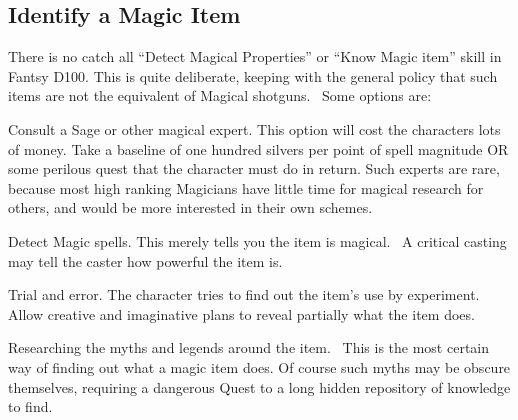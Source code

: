 \subsection{Identify a Magic Item}
There is no catch all “Detect Magical Properties” or “Know Magic item” skill in Fantsy D100. This is quite deliberate, keeping with the general policy that such items are not the equivalent of Magical shotguns.  Some options are:

Consult a Sage or other magical expert. This option will cost the characters lots of money. Take a baseline of one hundred silvers per point of spell magnitude OR some perilous quest that the character must do in return. Such experts are rare, because most high ranking Magicians have little time for magical research for others, and would be more interested in their own schemes. 

Detect Magic spells. This merely tells you the item is magical.  A critical casting may tell the caster how powerful the item is.

Trial and error. The character tries to find out the item’s use by experiment. Allow creative and imaginative plans to reveal partially what the item does.

Researching the myths and legends around the item.  This is the most certain way of finding out what a magic item does. Of course such myths may be obscure themselves, requiring a dangerous Quest to a long hidden repository of knowledge to find.
